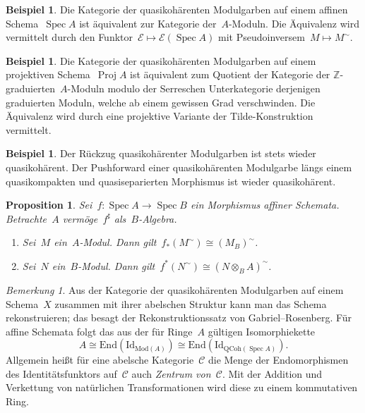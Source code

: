 \documentclass[a4paper,ngerman,12pt]{scrartcl}
\theoremstyle{definition}
\newtheorem{ex}[defn]{Beispiel}
\theoremstyle{plain}
\newtheorem{prop}[defn]{Proposition}
\theoremstyle{remark}
\newtheorem{rem}[defn]{Bemerkung}
\newcommand{\ZZ}{\mathbb{Z}}
\newcommand{\C}{\mathcal{C}}
\newcommand{\E}{\mathcal{E}}
\DeclareMathOperator{\Spec}{Spec}
\DeclareMathOperator{\Proj}{Proj}
\begin{document}
\begin{ex}Die Kategorie der quasikohärenten Modulgarben auf einem affinen
Schema~$\Spec A$ ist äquivalent zur Kategorie der~$A$-Moduln. Die Äquivalenz
wird vermittelt durch den Funktor~$\E \mapsto \E(\Spec A)$ mit
Pseudoinversem~$M \mapsto M^\sim$.\end{ex}

\begin{ex}Die Kategorie der quasikohärenten Modulgarben auf einem projektiven
Schema~$\Proj A$ ist äquivalent zum Quotient der Kategorie der
$\ZZ$-graduierten~$A$-Moduln modulo der Serreschen Unterkategorie derjenigen
graduierten Moduln, welche ab einem gewissen Grad verschwinden. Die Äquivalenz
wird durch eine projektive Variante der Tilde-Konstruktion vermittelt.\end{ex}

\begin{ex}Der Rückzug quasikohärenter Modulgarben ist stets wieder
quasikohärent. Der Pushforward einer quasikohärenten Modulgarbe längs einem
quasikompakten und quasiseparierten Morphismus ist wieder
quasikohärent.\end{ex}

\begin{prop}Sei~$f : \Spec A \to \Spec B$ ein Morphismus affiner Schemata.
Betrachte~$A$ vermöge~$f^\sharp$ als~$B$-Algebra.
\begin{enumerate}
\item Sei~$M$ ein~$A$-Modul. Dann gilt~$f_*(M^\sim) \cong (M_B)^\sim$.
\item Sei~$N$ ein~$B$-Modul. Dann gilt~$f^*(N^\sim) \cong (N \otimes_B
A)^\sim$.
\end{enumerate}
\end{prop}

\begin{rem}Aus der Kategorie der quasikohärenten Modulgarben auf einem
Schema~$X$ zusammen mit ihrer abelschen Struktur kann man das Schema
rekonstruieren; das besagt der Rekonstruktionssatz von Gabriel--Rosenberg. Für
affine Schemata folgt das aus der für Ringe~$A$ gültigen Isomorphiekette
\[ A \cong \mathrm{End}(\mathrm{Id}_{\mathrm{Mod}(A)})
  \cong \mathrm{End}(\mathrm{Id}_{\mathrm{QCoh}(\Spec A)}). \]
Allgemein heißt für eine abelsche Kategorie~$\C$ die Menge der Endomorphismen
des Identitätsfunktors auf~$\C$ auch \emph{Zentrum von~$\C$}. Mit der Addition
und Verkettung von natürlichen Transformationen wird diese zu einem
kommutativen Ring.
\end{rem}
\end{document}
